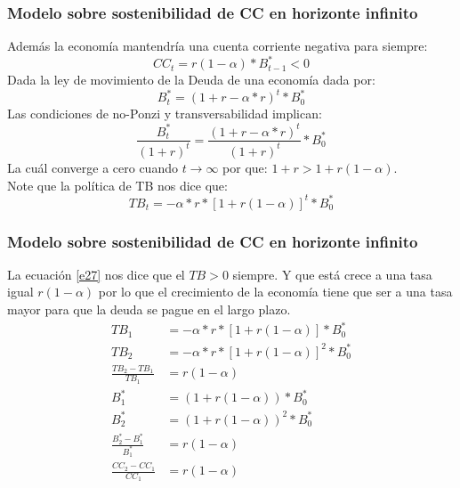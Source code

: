 \documentclass[10pt, xcolor=table, x11names]{beamer}
\begin{document}
		\begin{frame}
			\frametitle{{\normalsize Modelo sobre sostenibilidad de CC en horizonte infinito} {}}
			Además la economía mantendría una cuenta corriente negativa para siempre:
			\begin{equation}
			CC_{t}=r(1-\alpha)*B_{t-1}^{*}<0
			\label{e24}
			\end{equation}	
			Dada la ley de movimiento de la Deuda de una economía dada por:
			\begin{equation}
			B_{t}^{*}=(1+r-\alpha*r)^{t}*B_{0}^{*}
			\label{e25}
			\end{equation}	
			Las condiciones de no-Ponzi y transversabilidad implican:
			\begin{equation}
			\frac{B_{t}^{*}}{(1+r)^{t}}=\frac{(1+r-\alpha*r)^{t}}{(1+r)^{t}}*B_{0}^{*}
			\label{e26}
			\end{equation}	
			La cuál converge a cero cuando $t\longrightarrow\infty$ por que: $ 1+r>1+r(1-\alpha)$.\\
			
			Note que la política de TB nos dice que:
			\begin{equation}
			TB_{t}=-\alpha*r*[1+r(1-\alpha)]^{t}*B_{0}^{*}
			\label{e27}
			\end{equation}	
			
		\end{frame}	
		
		
		\begin{frame}
			\frametitle{{\normalsize Modelo sobre sostenibilidad de CC en horizonte infinito} {}}
			La ecuación \ref{e27} nos dice que el $TB>0$ siempre. Y que está crece a una tasa igual $r(1-\alpha)$ por lo que el crecimiento de la economía tiene que ser a una tasa mayor para que la deuda se pague en el largo plazo.
			\begin{align}
			TB_{1}&=-\alpha*r*[1+r(1-\alpha)]*B_{0}^{*} \nonumber\\
			TB_{2}&=-\alpha*r*[1+r(1-\alpha)]^{2}*B_{0}^{*} \nonumber\\
			\frac{TB_{2}-TB_{1}}{TB_{1}}&=r(1-\alpha)\nonumber\\
			B_{1}^{*}&=(1+r(1-\alpha))*B_{0}^{*}\nonumber\\
			B_{2}^{*}&=(1+r(1-\alpha))^{2}*B_{0}^{*}\nonumber\\
			\frac{B_{2}^{*}-B_{1}^{*}}{B_{1}^{*}}&=r(1-\alpha)\nonumber\\
			\frac{CC_{2}-CC_{1}}{CC_{1}}&=r(1-\alpha)\nonumber
			\end{align}	
			
			
		\end{frame}	
\end{document}
